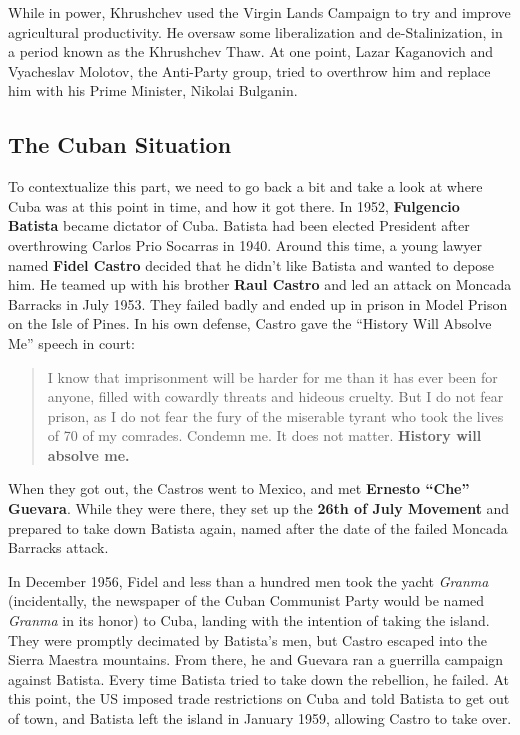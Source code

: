 While in power, Khrushchev used the Virgin Lands Campaign to try and improve agricultural productivity.
He oversaw some liberalization and de-Stalinization, in a period known as the Khrushchev Thaw.
At one point, Lazar Kaganovich and Vyacheslav Molotov, the Anti-Party group, tried to overthrow him
and replace him with his Prime Minister, Nikolai Bulganin.

\subsection*{The Cuban Situation}

To contextualize this part,
we need to go back a bit and take a look at where Cuba was at this point in time, and how it got there.
In 1952, \textbf{Fulgencio Batista} became dictator of Cuba.
Batista had been elected President after overthrowing Carlos Prio Socarras in 1940.
Around this time,
a young lawyer named \textbf{Fidel Castro} decided that he didn't like Batista and wanted to depose him.
He teamed up with his brother \textbf{Raul Castro} and led an attack on Moncada Barracks in July 1953.
They failed badly and ended up in prison in Model Prison on the Isle of Pines.
In his own defense, Castro gave the ``History Will Absolve Me'' speech in court:
\begin{quote}
  I know that imprisonment will be harder for me than it has ever been for anyone,
  filled with cowardly threats and hideous cruelty.
  But I do not fear prison,
  as I do not fear the fury of the miserable tyrant who took the lives of 70 of my comrades.
  Condemn me.
  It does not matter.
  \textbf{History will absolve me.}
\end{quote}

When they got out, the Castros went to Mexico, and met \textbf{Ernesto ``Che'' Guevara}.
While they were there, they set up the \textbf{26th of July Movement} and prepared to take down Batista again,
named after the date of the failed Moncada Barracks attack.

In December 1956, Fidel and less than a hundred men took the yacht \textit{Granma}
(incidentally, the newspaper of the Cuban Communist Party would be named \textit{Granma} in its honor)
to Cuba, landing with the intention of taking the island.
They were promptly decimated by Batista's men, but Castro escaped into the Sierra Maestra mountains.
From there, he and Guevara ran a guerrilla campaign against Batista.
Every time Batista tried to take down the rebellion, he failed.
At this point, the US imposed trade restrictions on Cuba and told Batista to get out of town,
and Batista left the island in January 1959, allowing Castro to take over.

